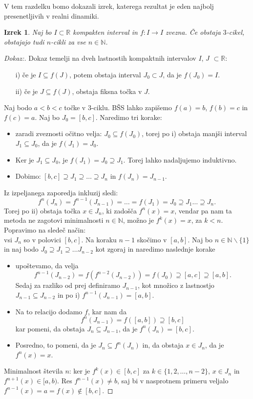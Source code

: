 \documentclass{article}
\newtheorem{izrek}{Izrek}
\newcommand{\N}{\mathbb{N}}
\newcommand{\R}{\mathbb{R}}
\begin{document}
V tem razdelku bomo dokazali izrek, katerega rezultat je eden najbolj 
presenetljivih v realni dinamiki.
\begin{izrek}
Naj bo $I \subset \R$ kompakten interval in $f: I \rightarrow I$ zvezna. 
Če obstaja $3$-cikel, obstajajo tudi $n$-cikli za vse $n\in \N$.
\end{izrek}
\begin{proof}[Dokaz:]
Dokaz temelji na dveh lastnostih kompaktnih intervalov $I$, $J$ $\subset \R$:
\begin{enumerate}
    \item[i)] če je $I \subseteq f(J)$, potem obstaja interval $J_0 \subset J$, 
    da je $f(J_0) = I$.
    \item[ii)] če je $J \subseteq f(J)$, obstaja fiksna točka v $J$.
\end{enumerate}

Naj bodo $a < b < c$ točke v $3$-ciklu. BŠS lahko zapišemo $f(a) = b$,
$f(b) = c$ in $f(c) = a$. Naj bo $J_0 = [b, c]$. Naredimo tri korake:
\begin{itemize}
    \item zaradi zveznosti očitno velja: $J_0 \subseteq f(J_0)$, torej po 
    i) obstaja manjši interval $J_1 \subseteq J_0$, da je $f(J_1) = J_0$.
    \item Ker je $J_1 \subseteq J_0$, je $f(J_1) = J_0 \supseteq J_1$. 
    Torej lahko nadaljujemo induktivno.
    \item Dobimo: $[b, c] \supseteq J_1 \supseteq \dots \supseteq J_n$ in 
    $f(J_n) = J_{n-1}$.
\end{itemize}
Iz izpeljanega zaporedja inkluzij sledi: 
$$
f^n(J_n) = f^{n-1}(J_{n-1}) = \dots = f(J_1) = J_0 \supseteq J_1 \dots \supseteq J_n.
$$
Torej po ii) obstaja točka $x\in J_n$, ki zadošča $f^n(x) = x$, vendar pa 
nam ta metoda ne zagotovi minimalnosti $n\in \N$, možno je $f^k(x) = x$, 
za $k < n$. Popravimo na sledeč način:\\
vsi $J_n$ so v polovici $[b, c]$. Na koraku $n-1$ skočimo v $[a, b]$.
Naj bo $n\in \N\backslash \{1\}$ in naj bodo $J_0 \supseteq J_1 \supseteq \dots J_{n-2}$
kot zgoraj in naredimo naslednje korake
\begin{itemize}
    \item upoštevamo, da velja 
    $$
    f^{n-1}(J_{n-2}) = f(f^{n-2}(J_{n-2})) = f(J_0) \supseteq [a, c] \supseteq [a, b].
    $$
    Sedaj za razliko od prej definiramo $J_{n-1}$, kot množico z lastnostjo 
    $J_{n-1} \subseteq J_{n-2}$ in po i) $f^{n-1}(J_{n-1}) = [a, b]$.
    \item Na to relacijo dodamo $f$, kar nam da 
    $$
    f^n(J_{n-1}) = f([a, b]) \supseteq [b, c]
    $$
    kar pomeni, da obstaja $J_n \subseteq J_{n-1}$, da je $f^n(J_n) = [b, c]$.
    \item Posredno, to pomeni, da je $J_n \subseteq f^n(J_n)$ in, da obstaja $x\in J_n$, 
    da je $f^n(x) = x$.     
\end{itemize}
Minimalnost števila $n$: ker je $f^k(x) \in [b, c]$ za $k\in \{1, 2, \dots, n-2\}$, $x\in J_n$
in $f^{n+1}(x) \in [a, b)$. Res $f^{n-1}(x) \neq b$, saj bi v nasprotnem 
primeru veljalo $f^{n-1}(x) = a = f(x) \not\in [b, c]$. 


\end{proof}
\end{document}

